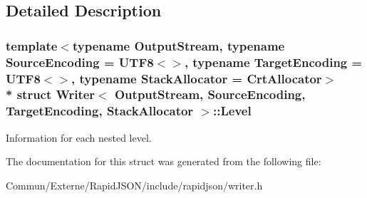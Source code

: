 \subsection{Detailed Description}
\subsubsection*{template$<$typename Output\+Stream, typename Source\+Encoding = U\+T\+F8$<$$>$, typename Target\+Encoding = U\+T\+F8$<$$>$, typename Stack\+Allocator = Crt\+Allocator$>$\\*
struct Writer$<$ Output\+Stream, Source\+Encoding, Target\+Encoding, Stack\+Allocator $>$\+::\+Level}

Information for each nested level. 

The documentation for this struct was generated from the following file\+:\begin{DoxyCompactItemize}
\item 
Commun/\+Externe/\+Rapid\+J\+S\+O\+N/include/rapidjson/writer.\+h\end{DoxyCompactItemize}
